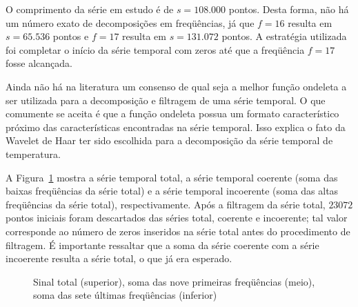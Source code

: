 O comprimento da série em estudo é de $s=108.000$ pontos. Desta forma, não há um número exato de decomposições em freqüências, já que $f=16$ resulta em $s=65.536$ pontos e $f=17$ resulta em $s=131.072$ pontos. A estratégia utilizada foi completar o início da série temporal com zeros até que a freqüência $f=17$ fosse alcançada. 
 
Ainda não há na literatura um consenso de qual seja a melhor função ondeleta a ser utilizada para a decomposição e filtragem de uma série temporal. O que comumente se aceita é que a função ondeleta possua um formato característico próximo das características encontradas na série temporal. Isso explica o fato da Wavelet de Haar ter sido escolhida para a decomposição da série temporal de temperatura.  

A Figura~\ref{figfiltrotS0681200} mostra a série temporal total, a série temporal coerente (soma das baixas freqüências da série total) e a série temporal incoerente (soma das altas freqüências da série total), respectivamente. Após a filtragem da série total, $23072$ pontos iniciais foram descartados das séries total, coerente e incoerente; tal valor corresponde ao número de zeros inseridos na série total antes do procedimento de filtragem. É importante ressaltar que a soma da série coerente com a série incoerente resulta a série total, o que já era esperado.

\begin{figure}[ht]
\centering {}
\caption{Sinal total (superior), soma das nove primeiras freqüências (meio), soma das sete últimas freqüências (inferior)}
\label{figfiltrotS0681200}
\end{figure}

